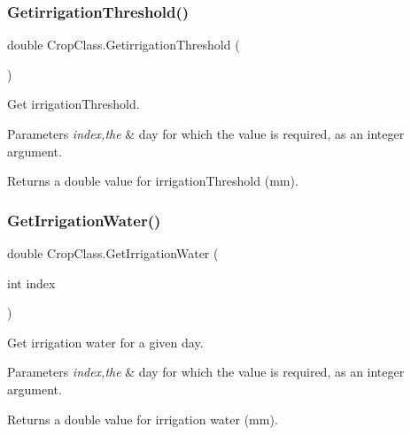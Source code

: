 \subsubsection{\texorpdfstring{GetirrigationThreshold()}{GetirrigationThreshold()}}
{\footnotesize\ttfamily double Crop\+Class.\+Getirrigation\+Threshold (\begin{DoxyParamCaption}{ }\end{DoxyParamCaption})\hspace{0.3cm}{\ttfamily [inline]}}



Get irrigation\+Threshold. 


\begin{DoxyParams}{Parameters}
{\em index,the} & day for which the value is required, as an integer argument. \\
\hline
\end{DoxyParams}
\begin{DoxyReturn}{Returns}
a double value for irrigation\+Threshold (mm). 
\end{DoxyReturn}
\mbox{\label{class_crop_class_acdf24f6b8427ae6dfad88d6dd8cdd01a}} 
\subsubsection{\texorpdfstring{GetIrrigationWater()}{GetIrrigationWater()}}
{\footnotesize\ttfamily double Crop\+Class.\+Get\+Irrigation\+Water (\begin{DoxyParamCaption}\item[{int}]{index }\end{DoxyParamCaption})\hspace{0.3cm}{\ttfamily [inline]}}



Get irrigation water for a given day. 


\begin{DoxyParams}{Parameters}
{\em index,the} & day for which the value is required, as an integer argument. \\
\hline
\end{DoxyParams}
\begin{DoxyReturn}{Returns}
a double value for irrigation water (mm). 
\end{DoxyReturn}
\mbox{\label{class_crop_class_a05dda60a40d7bad3e932a37acfffc0d5}} 
